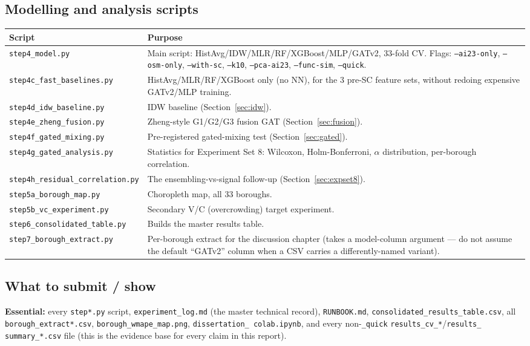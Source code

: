 \documentclass[11pt]{article}
\let\oldsubsection\subsection
\renewcommand{\subsection}[1]{\oldsubsection{\color{sectcolor}#1}}
\begin{document}
\subsection{Modelling and analysis scripts}
\begin{center}
\small
\begin{tabular}{@{}p{5.2cm}p{9.5cm}@{}}
\toprule
\textbf{Script} & \textbf{Purpose} \\
\midrule
\texttt{step4\_model.py} & Main script: HistAvg/IDW/MLR/RF/XGBoost/MLP/GATv2, 33-fold CV.
Flags: \texttt{--ai23-only}, \texttt{--osm-only}, \texttt{--with-sc}, \texttt{--k10},
\texttt{--pca-ai23}, \texttt{--func-sim}, \texttt{--quick}. \\
\texttt{step4c\_fast\_baselines.py} & HistAvg/MLR/RF/XGBoost only (no NN), for the 3 pre-SC
feature sets, without redoing expensive GATv2/MLP training. \\
\texttt{step4d\_idw\_baseline.py} & IDW baseline (Section~\ref{sec:idw}). \\
\texttt{step4e\_zheng\_fusion.py} & Zheng-style G1/G2/G3 fusion GAT (Section~\ref{sec:fusion}). \\
\texttt{step4f\_gated\_mixing.py} & Pre-registered gated-mixing test (Section~\ref{sec:gated}). \\
\texttt{step4g\_gated\_analysis.py} & Statistics for Experiment Set 8: Wilcoxon, Holm-Bonferroni,
$\alpha$ distribution, per-borough correlation. \\
\texttt{step4h\_residual\_correlation.py} & The ensembling-vs-signal follow-up
(Section~\ref{sec:expset8}). \\
\texttt{step5a\_borough\_map.py} & Choropleth map, all 33 boroughs. \\
\texttt{step5b\_vc\_experiment.py} & Secondary V/C (overcrowding) target experiment. \\
\texttt{step6\_consolidated\_table.py} & Builds the master results table. \\
\texttt{step7\_borough\_extract.py} & Per-borough extract for the discussion chapter
(takes a model-column argument --- do not assume the default ``GATv2'' column when a CSV
carries a differently-named variant). \\
\bottomrule
\end{tabular}
\end{center}

\subsection{What to submit / show}
\textbf{Essential:} every \texttt{step*.py} script, \texttt{experiment\_log.md} (the master
technical record), \texttt{RUNBOOK.md}, \texttt{consolidated\_results\_table.csv}, all
\texttt{borough\_extract*.csv}, \texttt{borough\_wmape\_map.png}, \texttt{dissertation\_
colab.ipynb}, and every non-\texttt{\_quick} \texttt{results\_cv\_*}/\texttt{results\_
summary\_*.csv} file (this is the evidence base for every claim in this report).
\end{document}
